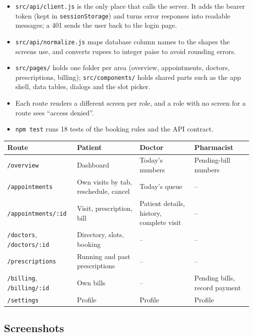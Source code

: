 \documentclass[11pt,a4paper]{article}
\newcommand{\code}[1]{\texttt{#1}}
\begin{document}
\begin{itemize}
  \item \code{src/api/client.js} is the only place that calls the server. It adds the bearer token (kept in \code{sessionStorage}) and turns error responses into readable messages; a 401 sends the user back to the login page.
  \item \code{src/api/normalize.js} maps database column names to the shapes the screens use, and converts rupees to integer paise to avoid rounding errors.
  \item \code{src/pages/} holds one folder per area (overview, appointments, doctors, prescriptions, billing); \code{src/components/} holds shared parts such as the app shell, data tables, dialogs and the slot picker.
  \item Each route renders a different screen per role, and a role with no screen for a route sees ``access denied''.
  \item \code{npm test} runs 18 tests of the booking rules and the API contract.
\end{itemize}

\begin{center}
\small
\begin{tabularx}{\textwidth}{l L L L}
\toprule
\textbf{Route} & \textbf{Patient} & \textbf{Doctor} & \textbf{Pharmacist} \\
\midrule
\code{/overview}          & Dashboard & Today's numbers & Pending-bill numbers \\
\code{/appointments}      & Own visits by tab, reschedule, cancel & Today's queue & -- \\
\code{/appointments/:id}  & Visit, prescription, bill & Patient details, history, complete visit & -- \\
\code{/doctors}, \code{/doctors/:id} & Directory, slots, booking & -- & -- \\
\code{/prescriptions}     & Running and past prescriptions & -- & -- \\
\code{/billing}, \code{/billing/:id} & Own bills & -- & Pending bills, record payment \\
\code{/settings}          & Profile & Profile & Profile \\
\bottomrule
\end{tabularx}
\end{center}

\subsection{Screenshots}
\end{document}
